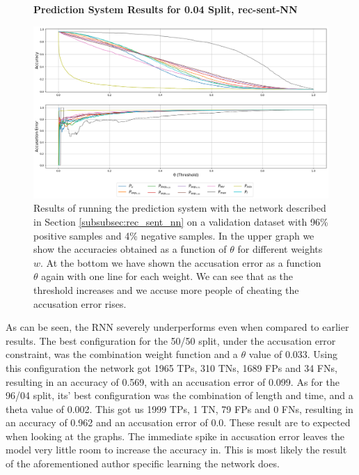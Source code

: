 \begin{figure}
    \centering
    \textbf{Prediction System Results for 0.04 Split, \glsdesc{rec-sent-NN}}\par\medskip
    \includegraphics[scale=0.33]{./pictures/experiments/rec_sent_nn/prediction_system_04.png}
    \caption{Results of running the prediction system with the network described
        in Section \ref{subsubsec:rec_sent_nn} on a validation dataset
        with 96\% positive samples and 4\% negative samples. In the upper graph
        we show the accuracies obtained as a function of $\theta$ for different
        weights $w$. At the bottom we have shown the accusation error as a
        function $\theta$ again with one line for each weight. We can see that
        as the threshold increases and we accuse more people of cheating the
        accusation error rises.}
    \label{fig:rec-sent-NN-pred-4}
\end{figure}

As can be seen, the \gls{RNN} severely underperforms even when compared
to earlier results. The best configuration for the 50/50 split, under the
accusation error constraint, was the combination weight function and a $\theta$
value of 0.033. Using this configuration the network got 1965 \gls{TP}s,
310 \gls{TN}s, 1689 \gls{FP}s and 34 \gls{FN}s, resulting in an accuracy of
0.569, with an accusation error of 0.099. As for the 96/04 split, its' best
configuration was the combination of length and time, and a theta value of
0.002. This got us 1999 \gls{TP}s, 1 \gls{TN}, 79 \gls{FP}s and 0 \gls{FN}s,
resulting in an accuracy of 0.962 and an accusation error of 0.0. These result
are to expected when looking at the graphs. The immediate spike in accusation
error leaves the model very little room to increase the accuracy in. This is
most likely the result of the aforementioned author specific learning the
network does.


